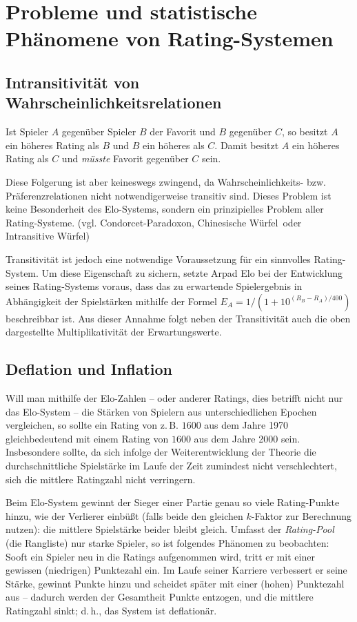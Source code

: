 \chapter{Probleme und statistische Phänomene von Rating-Systemen}

\section{Intransitivität von Wahrscheinlichkeitsrelationen}

Ist Spieler $A$ gegenüber Spieler $B$ der Favorit und $B$ gegenüber $C$, so besitzt $A$ ein höheres Rating als $B$ und $B$ ein höheres als $C$. Damit besitzt $A$ ein höheres Rating als $C$ und \textit{müsste} Favorit gegenüber $C$ sein.

Diese Folgerung ist aber keineswegs zwingend, da Wahrscheinlichkeits- bzw. Präferenzrelationen nicht notwendigerweise transitiv sind. Dieses Problem ist keine Besonderheit des Elo-Systems, sondern ein prinzipielles Problem aller Rating-Systeme. (vgl. Condorcet-Paradoxon, \glqq Chinesische Würfel\grqq\ oder \glqq Intransitive Würfel\grqq )

Transitivität ist jedoch eine notwendige Voraussetzung für ein sinnvolles Rating-System. Um diese Eigenschaft zu sichern, setzte Arpad Elo bei der Entwicklung seines Rating-Systems voraus, dass das zu erwartende Spielergebnis in Abhängigkeit der Spielstärken mithilfe der Formel $E_{A} = 1 / (1 + 10^{(R_{B} - R_{A}) / 400})$ beschreibbar ist. Aus dieser Annahme folgt neben der Transitivität auch die oben dargestellte Multiplikativität der Erwartungswerte.


\section{Deflation und Inflation}

Will man mithilfe der Elo-Zahlen -- oder anderer Ratings, dies betrifft nicht nur das Elo-System -- die Stärken von Spielern aus unterschiedlichen Epochen vergleichen, so sollte ein Rating von z.\,B. $1600$ aus dem Jahre 1970 gleichbedeutend mit einem Rating von $1600$ aus dem Jahre 2000 sein. Insbesondere sollte, da sich infolge der Weiterentwicklung der Theorie die durchschnittliche Spielstärke im Laufe der Zeit zumindest nicht verschlechtert, sich die mittlere Ratingzahl nicht verringern.

Beim Elo-System gewinnt der Sieger einer Partie genau so viele Rating-Punkte hinzu, wie der Verlierer einbüßt (falls beide den gleichen $k$-Faktor zur Berechnung nutzen): die mittlere Spielstärke beider bleibt gleich. Umfasst der \textit{Rating-Pool} (die Rangliste) nur starke Spieler, so ist folgendes Phänomen zu beobachten: Sooft ein Spieler neu in die Ratings aufgenommen wird, tritt er mit einer gewissen (niedrigen) Punktezahl ein. Im Laufe seiner Karriere verbessert er seine Stärke, gewinnt Punkte hinzu und scheidet später mit einer (hohen) Punktezahl aus -- dadurch werden der Gesamtheit Punkte entzogen, und die mittlere Ratingzahl sinkt; d.\,h., das System ist deflationär.

